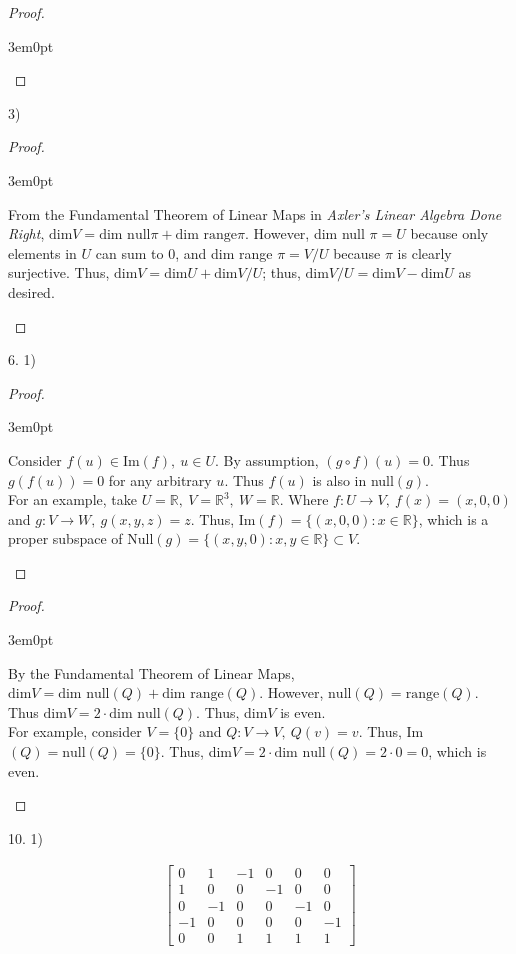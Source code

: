 \documentclass[11pt]{article}
\newcommand{\R}{\mathbb{R}}
\newenvironment{myproof}
{\begin{proof} \begin{adjustwidth}{3em}{0pt}$ $\par\nobreak\ignorespaces}
{\end{adjustwidth} \end{proof}}
\begin{document}
\begin{flushleft}
\begin{myproof}
\end{myproof}

3)

\begin{myproof}

From the Fundamental Theorem of Linear Maps in \textit{Axler's Linear Algebra Done Right}, $\text{dim} V = \text{dim null}\pi + \text{dim range}\pi$. However, dim null $\pi = U$ because only elements in $U$ can sum to 0, and dim range $\pi= V/U$ because $\pi$ is clearly surjective. Thus, $\text{dim} V = \text{dim}U + \text{dim} V/U$; thus, $\text{dim} V/U = \text{dim}V - \text{dim}U$ as desired.

\end{myproof}

\newpage

6. 1)

\begin{myproof}

Consider $f(u) \in \text{Im}(f), \ u \in U$. By assumption, $(g \circ f)(u) = 0$. Thus $g(f(u)) = 0$ for any arbitrary $u$. Thus $f(u)$ is also in null$(g)$. \\
\bigskip
For an example, take $U = \R, \ V = \R^3, \ W = \R$. Where $f: U \rightarrow V, \ f(x) = (x,0,0)$ and $g: V \rightarrow W, \ g(x,y,z) = z$. Thus, Im$(f) = \{ (x,0,0): x \in \R \}$, which is a proper subspace of Null$(g) = \{ (x,y,0): x,y \in \R \} \subset V$.

\end{myproof}

\begin{myproof}

By the Fundamental Theorem of Linear Maps, $\text{dim} V = \text{dim null} (Q) + \text{dim range} (Q)$. However, $\text{null} (Q) = \text{range} (Q)$. Thus $\text{dim}V = 2 \cdot \text{dim null} (Q)$. Thus, dim$V$ is even. \\
\bigskip
For example, consider $V = \{ 0 \}$ and $Q: V \rightarrow V, \ Q(v) = v$. Thus, Im$(Q) = \text{null}(Q) = \{ 0 \}$. Thus, dim$V = 2 \cdot \text{dim null}(Q)  = 2 \cdot 0 = 0$, which is even.

\end{myproof}

\newpage

10. 1)

\begin{align*}
\begin{bmatrix}
0 & 1 & -1 & 0 & 0 & 0 \\
1 & 0 & 0 & -1 & 0 & 0 \\
0 & -1 & 0 & 0 & -1 & 0 \\
-1 & 0 & 0 & 0 & 0 & -1 \\
0 & 0 & 1 & 1 & 1 & 1
\end{bmatrix}
\end{align*}



\end{flushleft}
\end{document}

